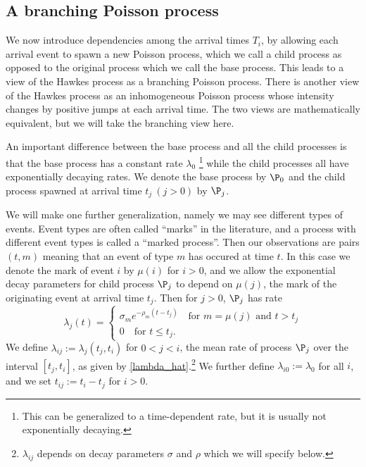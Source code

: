 \documentclass[12pt,leqno]{article}
\begin{document}
\subsection{A branching Poisson process}
We now introduce dependencies among the arrival times $T_i$, by allowing each arrival event 
to spawn a new Poisson process, which we call a child process as opposed to the original process which we
call the base process.  This leads to a view of the Hawkes process as a branching Poisson process. There
is another view of the Hawkes process as an inhomogeneous Poisson process whose intensity changes by positive
jumps at each arrival time.  The two views are mathematically equivalent, but we will take the branching view here.

An important difference between the base process and all the child processes is that the base process
has a constant rate $\lambda_0$ \footnote{This can be generalized to a time-dependent rate, but it is usually not exponentially decaying.} while the child processes all have exponentially decaying rates.  We denote the base
process by $\P_0$ and the child process spawned at arrival time
$t_j~(j > 0)$ by $\P_j$.  

We will make one further generalization, namely we may see
different types of events.  Event types are often called ``marks'' in the literature, and a process with different
event types is called a ``marked process''. 
Then our observations are pairs $(t,m)$ meaning that an event of type $m$ has occured at time $t$.  In this
case we denote the mark of event $i$ by $\mu(i)$ for $i > 0$, and we allow the exponential decay parameters for
child process
$\P_j$ to depend on $\mu(j)$, the mark of the originating event at arrival time $t_j$.  Then for
$j>0$, $\P_j$ has rate
\begin{equation}\label{child_rate}
\lambda_j(t) =
\begin{cases}
  \sigma_{m}e^{-\rho_{m}(t-t_j)}\quad\text{for $m = \mu(j)$ and $t > t_j$}\\
  0\quad\text{for $t \le t_j$}.
\end{cases}
\end{equation}
We define $\lambda_{ij} := \hat{\lambda_j}(t_j,t_i)$ for $0 <j < i$, the mean rate of process $\P_j$ over
the interval $[t_j,t_i]$, as given by \eqref{lambda_hat}.\footnote{$\lambda_{ij}$ depends on decay
parameters $\sigma$ and $\rho$ which we will specify below.}  We further define
$\lambda_{i0} := \lambda_0$ for all $i$, and we set $t_{ij} := t_i-t_j$ for $i > 0$. 
\end{document}
